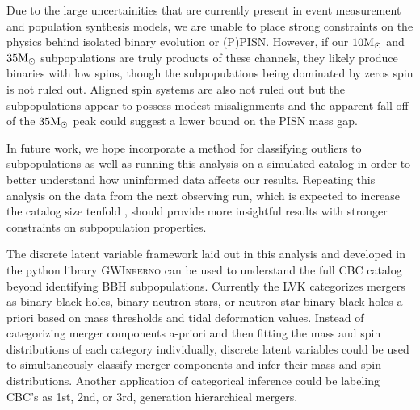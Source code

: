 Due to the large uncertainities that are currently present in event measurement and population synthesis models, we are unable to place strong constraints on the physics behind isolated binary evolution or (P)PISN. However, if our $10{\rm M}_\odot$ and $35{\rm M}_\odot$ subpopulations are truly products of these channels, they likely produce binaries with low spins, though the subpopulations being dominated by zeros spin is not ruled out. Aligned spin systems are also not ruled out but the subpopulations appear to possess modest misalignments and the apparent fall-off of the $35{\rm M}_\odot$ peak could suggest a lower bound on the PISN mass gap. 

In future work, we hope incorporate a method for classifying outliers to subpopulations as well as running this analysis on a simulated catalog in order to better understand how uninformed data affects our results. Repeating this analysis on the data from the next observing run, which is expected to increase the catalog size tenfold , should provide more insightful results with stronger constraints on subpopulation properties. 

The discrete latent variable framework laid out in this analysis and developed in the python library \textsc{GWInferno} can be used to understand the full CBC catalog beyond identifying BBH subpopulations. Currently the LVK categorizes mergers as binary black holes, binary neutron stars, or neutron star binary black holes a-priori based on mass thresholds and tidal deformation values. Instead of categorizing merger components a-priori and then fitting the mass and spin distributions of each category individually, discrete latent variables could be used to simultaneously classify merger components and infer their mass and spin distributions. Another application of categorical inference could be labeling CBC's as 1st, 2nd, or 3rd, generation hierarchical mergers. 
